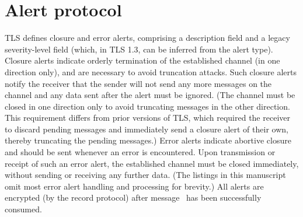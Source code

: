 \section{Alert protocol}
\label{sec:alerts}

TLS defines closure and error alerts, comprising a description field and a legacy 
severity-level field (which, in TLS 1.3, can be inferred from the alert type). 
%
Closure alerts indicate orderly termination of the established channel (in one direction 
only), and are necessary to avoid truncation attacks. Such closure alerts notify the 
receiver that the sender will not send any more messages on the channel and any data sent
after the alert must be ignored. (The channel must be closed in one direction only 
to avoid truncating messages in the other direction. This requirement
differs from prior versions of TLS, which required the receiver to discard pending 
messages and immediately send a closure alert of their own, thereby truncating the
pending messages.)
%
Error alerts indicate abortive closure and should be sent whenever an error 
is encountered. Upon transmission or receipt of such an error alert, the established 
channel must be closed immediately, without sending or receiving any further data.
(The listings in this manuscript omit most error alert handling and processing for brevity.)
%
All alerts are encrypted (by the record protocol) after message \ServerHello\ has been 
successfully consumed. 



